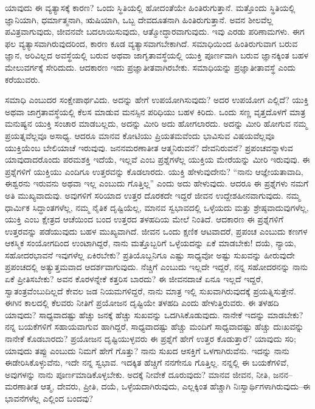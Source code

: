 \vskip 0.3cm

ಯಾವುದು ಈ ವ್ಯತ್ಯಾಸಕ್ಕೆ ಕಾರಣ? ಒಂದು ಸ್ಥಿತಿಯಲ್ಲಿ ಹೋದಂತೆಯೇ ಹಿಂತಿರುಗುತ್ತಾನೆ. ಮತ್ತೊಂದು ಸ್ಥಿತಿಯಲ್ಲಿ ಜ್ಞಾನಿಯಾಗಿ, ಧರ್ಮಾತ್ಮನಾಗಿ, ಋಷಿಯಾಗಿ, ಒಬ್ಬ ದೇವದೂತನಾಗಿ ಹಿಂತಿರುಗುತ್ತಾನೆ. ಅವನ ಶೀಲವೆಲ್ಲ ಪವಿತ್ರವಾಗುವುದು, ಜೀವನವೇ ಬದಲಾಯಿಸುವುದು, ಆತ್ಮೋದ್ಧಾರವಾಗುವುದು. ಇವು ಎರಡು ಪರಿಣಾಮಗಳು. ಈಗ ಫಲ ವ್ಯತ್ಯಾಸವಾಗಿರುವುದರಿಂದ, ಕಾರಣ ಕೂಡ ವ್ಯತ್ಯಾಸವಾಗಬೇಕಾಗಿದೆ. ಸಮಾಧಿಯಿಂದ ಹಿಂತಿರುಗುವಾಗ ಬರುವ ಜ್ಞಾನ, ಅರಿವಿಲ್ಲದ ಅವಸ್ಥೆಯಲ್ಲಿ ಬರುವ ಅಥವಾ ಜಾಗೃತಾವಸ್ಥೆಯಲ್ಲಿ ಯುಕ್ತಿ ಪೂರ್ಣವಾಗಿ ಬರುವ ಜ್ಞಾನಕ್ಕಿಂತ ಬಹಳ ಮೇಲುವರ್ಗಕ್ಕೆ \break ಸೇರಿದುದು. ಆದಕಾರಣ ಇದು ಪ್ರಜ್ಞಾತೀತವಾಗಿರಬೇಕು. ಸಮಾಧಿಯನ್ನು ಪ್ರಜ್ಞಾತೀತಾವಸ್ಥೆ ಎಂದು ಕರೆಯುವರು. 

\vskip 0.3cm

ಸಮಾಧಿ ಎಂಬುದರ ಸಂಕ್ಷೇಪಾರ್ಥವಿದು. ಅದನ್ನು ಹೇಗೆ ಉಪಯೋಗಿಸುವುದು? ಅದರ ಉಪಯೋಗ ಎಲ್ಲಿದೆ? ಯುಕ್ತಿ ಅಥವಾ ಜಾಗ್ರತಾವಸ್ಥೆಯಲ್ಲಿ ಕೆಲಸ ಮಾಡುವ ಮನಸ್ಸಿನ ಪರಿಧಿಯು ಬಹಳ ಕಿರಿದು. ಒಂದು ಸಣ್ಣ ವೃತ್ತದೊಳಗೆ ಮಾತ್ರ ಮನುಷ್ಯನ ಯುಕ್ತಿ ಸಂಚಾರ ಮಾಡಬಲ್ಲದು, ಅದನ್ನು ಮೀರಿ ಅದು ಹೋಗಲಾರದು. ಅದನ್ನು ಮೀರಿ ಹೋಗುವ ನಮ್ಮ ಪ್ರಯತ್ನವೆಲ್ಲವೂ ಅಸಾಧ್ಯ. ಆದರೂ ಮಾನವ ಕೋಟಿಯು ಪ್ರಿಯತಮವೆಂದು ಭಾವಿಸುವ ವಿಷಯವೆಲ್ಲವೂ ಯುಕ್ತಿಯೆಂಬ ಬೇಲಿಯಾಚೆ ಇರುವುವು. ಜನನಮರಣಾತೀತ ಆತ್ಮನಿರುವನೆ? ದೇವನಿರುವನೆ? ಪ್ರಪಂಚವನ್ನಾಳುವ ಯಾವುದಾದರೊಂದು ಪರಮಶಕ್ತಿ ಇದೆಯೆ, ಇಲ್ಲವೆ ಎಂಬ ಪ್ರಶ್ನೆಗಳೆಲ್ಲ ಯುಕ್ತಿಯ ಮೇರೆಯನ್ನು ಮೀರಿ ಇರುವುವು. ಈ ಪ್ರಶ್ನೆಗಳಿಗೆ ಯುಕ್ತಿಯು ಎಂದಿಗೂ ಉತ್ತರವನ್ನು ಕೊಡಲಾರದು. ಯುಕ್ತಿ ಹೇಳುವುದೇನು? “ನಾನು ಆಜ್ಞೇಯತಾವಾದಿ, ಈಶ್ವರನು ಇರುವನು ಅಥವಾ ಇಲ್ಲ ಎಂಬುದು ಗೊತ್ತಿಲ್ಲ” ಎಂದು ಅದು ಹೇಳುವುದು. ಆದರೂ ಈ ಪ್ರಶ್ನೆಗಳು ನಮಗೆ ಅತಿ ಮುಖ್ಯವಾದುವು. ಅವುಗಳಿಗೆ ಸರಿಯಾದ ಉತ್ತರ ದೊರಕದೇ ಇದ್ದರೆ ಜೀವನ ಉದ್ದೇಶಹೀನವಾಗುವುದು. ನಮ್ಮ ಧಾರ್ಮಿಕ ಸಿದ್ಧಾಂತಗಳೆಲ್ಲ, ನಮ್ಮ ನೈತಿಕ ದೃಷ್ಟಿಯೆಲ್ಲ, ಮಾನವ ಸ್ವಭಾವದಲ್ಲಿ ಒಳ್ಳೆಯದು ಮತ್ತು ಶ್ರೇಷ್ಠವಾದುವುಗಳೆಲ್ಲ, ಯುಕ್ತಿ ಎಂಬ ಕ್ಷೇತ್ರದ ಆಚೆಯಿಂದ ಬಂದ ಉತ್ತರದ ತಳಹದಿಯ ಮೇಲೆ ನಿಂತಿದೆ. ಆದಕಾರಣ ಈ ಪ್ರಶ್ನೆಗಳಿಗೆ ಉತ್ತರವನ್ನು ಪಡೆಯುವುದು ಬಹಳ ಮುಖ್ಯವಾಗಿದೆ. ಜೀವನ ಒಂದು ಕ್ಷಣಿಕ ಆಟವಾದರೆ, ಪ್ರಪಂಚ ಎಂಬುದು ಕಣಗಳ ಆಕಸ್ಮಿಕ ಸಂಯೋಗದಿಂದ ಉಂಟಾಗಿದ್ದರೆ, ನಾನು ಮತ್ತೊಬ್ಬರಿಗೆ ಒಳ್ಳೆಯದನ್ನು ಏಕೆ ಮಾಡಬೇಕು! ದಯೆ, ನ್ಯಾಯ, ಸಹೋದರಭಾವನೆ ಇವುಗಳೆಲ್ಲ ಏಕಿರಬೇಕು? ಪ್ರತಿಯೊಬ್ಬನಿಗೂ ಎಷ್ಟು ಸಾಧ್ಯವೋ ಅಷ್ಟು ಸುಖವನ್ನು ಹೀರುವುದೇ ಪ್ರಪಂಚದಲ್ಲಿ ಅತ್ಯುತ್ತಮವಾದ ಆದರ್ಶವಾಗುವುದು. ನೆಚ್ಚಿಗೆ ಎಂಬುದು ಇಲ್ಲದೇ ಇದ್ದರೆ, ನನ್ನ ಸಹೋದರನನ್ನು ನಾನು ಏಕೆ ಪ್ರೀತಿಸಬೇಕು? ಅವನ ಕೊರಳನ್ನೇಕೆ ಕತ್ತರಿಸ ಬಾರದು? ಈ ಜೀವನದಾಚೆ ಏನೂ ಇಲ್ಲದೆ ಇದ್ದರೆ, ಸ್ವಾತಂತ್ರವೆಂಬುದಿಲ್ಲದೆ ಕೇವಲ ಜಡ ನಿಯಮಗಳಿದ್ದರೆ, ನಾನು ಮಾತ್ರ ಇಲ್ಲಿ ಸುಖವಾಗಿರುವುದಕ್ಕೆ ಪ್ರಯತ್ನಿಸುತ್ತೇನೆ. ಈಗಿನ ಕಾಲದಲ್ಲಿ ಕೆಲವರು ನೀತಿಗೆ ಪ್ರಯೋಜನ ದೃಷ್ಟಿಯೇ ತಳಹದಿ ಎಂದು ಹೇಳುತ್ತಿರುವರು. ಈ ತಳಹದಿ ಯಾವುದು? ಸಾಧ್ಯವಾದಷ್ಟು ಹೆಚ್ಚು ಜನಕ್ಕೆ ಹೆಚ್ಚು ಸುಖವನ್ನು ಒದಗಿಸಿಕೊಡುವುದು. ನಾನೇಕೆ ಇದನ್ನು ಮಾಡಬೇಕು? ನನ್ನ ಬಯಕೆಗಳಿಗೆ ಸಹಾಯವಾಗುವ ಹಾಗಿದ್ದರೆ, ಸಾಧ್ಯವಾದಷ್ಟು ಹೆಚ್ಚು ಮಂದಿಗೆ ಸಾಧ್ಯವಾದಷ್ಟು ಹೆಚ್ಚು ದುಃಖವನ್ನು ನಾನೇಕೆ ಕೊಡಬಾರದು? ಪ್ರಯೋಜನ ದೃಷ್ಟಿಯುಳ್ಳವರು ಈ ಪ್ರಶ್ನೆಗೆ ಹೇಗೆ ಉತ್ತರ ಕೊಡುತ್ತಾರೆ? ಯಾವುದು ಸರಿ; ಯಾವುದು ತಪ್ಪು ಎಂಬುದು ನಿಮಗೆ ಹೇಗೆ ಗೊತ್ತು? ನಾನು ಸುಖದ ಆಸಕ್ತಿಗೆ ಒಳಗಾಗಿರುವೆನು. ಇದನ್ನು ನಾನು ಈಡೇರಿಸಿಕೊಳ್ಳುವೆನು, ಇದೇ ನನ್ನ ಸ್ವಭಾವ. ಇದಕ್ಕಿತ ಹೆಚ್ಚಿಗೆ ನನಗೇನೂ ಗೊತ್ತಿಲ್ಲ. ನನ್ನಲ್ಲಿ ಈ ಬಯಕೆಗಳಿವೆ, ಅವುಗಳನ್ನು ನಾನು ಪೂರ್ಣಮಾಡಿಕೊಳ್ಳಬೇಕು. ಅದಕ್ಕೆ ನೀವೇಕೆ ದೂರುವುದು? ಮಾನವ ಜೀವನ, ನೀತಿ, ಜನನ–ಮರಣಾತೀತ ಆತ್ಮ, ದೇವರು, ಪ್ರೀತಿ, ದಯೆ, ಒಳ್ಳೆಯದಾಗಿರುವುದು, ಎಲ್ಲಕ್ಕಿಂತ ಹೆಚ್ಚಾಗಿ ನಿಃಸ್ವಾರ್ಥಿಗಳಾಗಿರುವುದು–ಈ ಭಾವನೆಗಳೆಲ್ಲ ಎಲ್ಲಿಂದ ಬಂದವು?

